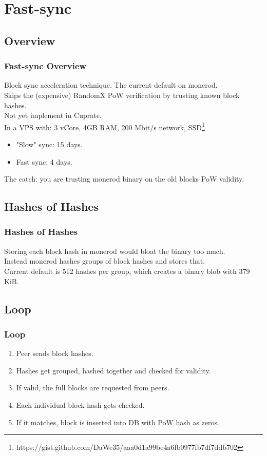 \documentclass[aspectratio=169]{beamer}
\begin{document}
\section{Fast-sync}
\subsection{Overview}
\begin{frame}[fragile]
  \frametitle{Fast-sync Overview}
  Block sync acceleration technique. The current default on monerod.\\
  Skips the (expensive) RandomX PoW verification by trusting known block hashes.\\
  Not yet implement in Cuprate.\\
  \vspace{2\baselineskip}
  In a VPS with: 3 vCore, 4GB RAM, 200 Mbit/s network, SSD\footnote{https://gist.github.com/DaWe35/aaa0d1a99be4a6fb0977fb7df7ddb702}
  \begin{itemize}
    \item "Slow" sync: 15 days.
    \item Fast sync: 4 days.
  \end{itemize}
  \vspace{2\baselineskip}
  The catch: you are trusting monerod binary on the old blocks PoW validity.
\end{frame}

\subsection{Hashes of Hashes}
\begin{frame}[fragile]
  \frametitle{Hashes of Hashes}
  Storing each block hash in monerod would bloat the binary too much.\\
  \vspace{1\baselineskip}
  Instead monerod hashes groups of block hashes and stores that.\\
  \vspace{1\baselineskip}
  Current default is 512 hashes per group, which creates a binary blob with 379 KiB.\\
\end{frame}

\subsection{Loop}
\begin{frame}[fragile]
  \frametitle{Loop}
  \begin{enumerate}
    \item Peer sends block hashes.
    \item Hashes get grouped, hashed together and checked for validity.
    \item If valid, the full blocks are requested from peers.
    \item Each individual block hash gets checked.
    \item If it matches, block is inserted into DB with PoW hash as zeros.
  \end{enumerate}
\end{frame}
\end{document}
